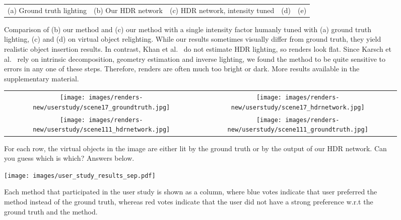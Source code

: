\begin{figure*}
\begin{tabular}{ccccc}
%
(a) Ground truth lighting &
(b) Our HDR network & 
(c) HDR network, intensity tuned & 
(d) \cite{khan-siggraph-06} & 
(e) \cite{karsch-tog-14}
\end{tabular}
\caption[]{Comparison of (b) our method and (c) our method with a single intensity factor humanly tuned with (a) ground truth lighting, (c) \cite{khan-siggraph-06} and (d) \cite{karsch-tog-14} on virtual object relighting. While our results sometimes visually differ from ground truth, they yield realistic object insertion results. In contrast, Khan et al.~ do not estimate HDR lighting, so renders look flat. Since Karsch et al.~ rely on intrinsic decomposition, geometry estimation and inverse lighting, we found the method to be quite sensitive to errors in any one of these steps. Therefore, renders are often much too bright or dark. More results available in the supplementary material.}
\label{f:results-comparison}
\end{figure*}

\begin{figure}
\centering
\footnotesize
\setlength{\tabcolsep}{1pt}
\begin{tabular}{cc}
\texttt{[image: images/renders-new/userstudy/scene17\_groundtruth.jpg]} & 
\texttt{[image: images/renders-new/userstudy/scene17\_hdrnetwork.jpg]} \\
\texttt{[image: images/renders-new/userstudy/scene111\_hdrnetwork.jpg]} & 
\texttt{[image: images/renders-new/userstudy/scene111\_groundtruth.jpg]} \\
\end{tabular}
\caption[]{For each row, the virtual objects in the image are either lit by the ground truth or by the output of our HDR network. Can you guess which is which? Answers below. \\
}
\label{f:results-userstudy}
\end{figure}

\begin{figure}
\centering
\texttt{[image: images/user\_study\_results\_sep.pdf]}
\caption{Each method that participated in the user study is shown as a column, where blue votes indicate that user preferred the method instead of the ground truth, whereas red votes indicate that the user did not have a strong preference w.r.t the ground truth and the method.}
\label{f:results-us-bars}
\end{figure}

